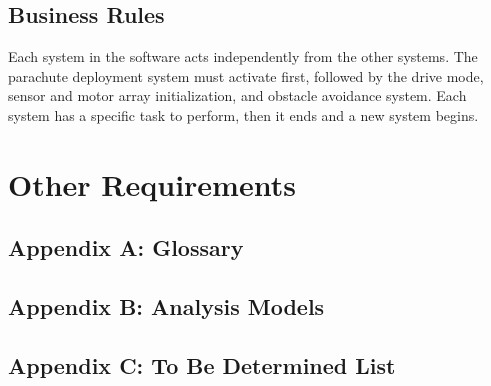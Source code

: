 \documentclass{scrreprt}
\begin{document}
\section{Business Rules}
Each system in the software acts independently from the other systems. The parachute deployment system must activate first, followed by the drive mode, sensor and motor array initialization, and obstacle avoidance system. Each system has a specific task to perform, then it ends and a new system begins.


\chapter{Other Requirements}


\section{Appendix A: Glossary}


\section{Appendix B: Analysis Models}


\section{Appendix C: To Be Determined List}
\end{document}
